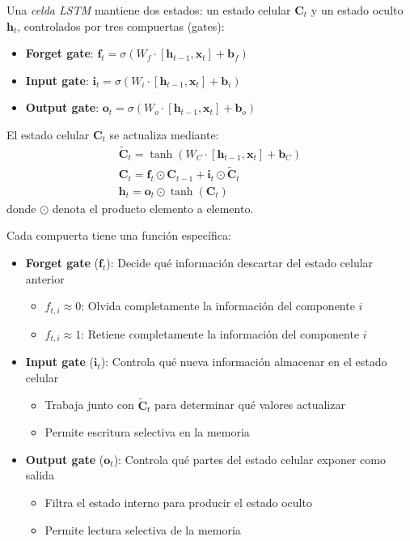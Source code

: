 \begin{definition}\label{def:lstm_cell}
	Una \textit{celda \gls{LSTM}} mantiene dos estados: un estado celular $\mathbf{C}_t$ y un estado oculto $\mathbf{h}_t$, controlados por tres compuertas (gates):
	\begin{itemize}
		\item \textbf{Forget gate}: $\mathbf{f}_t = \sigma(W_f \cdot [\mathbf{h}_{t-1}, \mathbf{x}_t] + \mathbf{b}_f)$
		\item \textbf{Input gate}: $\mathbf{i}_t = \sigma(W_i \cdot [\mathbf{h}_{t-1}, \mathbf{x}_t] + \mathbf{b}_i)$
		\item \textbf{Output gate}: $\mathbf{o}_t = \sigma(W_o \cdot [\mathbf{h}_{t-1}, \mathbf{x}_t] + \mathbf{b}_o)$
	\end{itemize}
	El estado celular $\mathbf{C}_t$ se actualiza mediante:
	\begin{gather*}
		\tilde{\mathbf{C}}_t = \tanh(W_C \cdot [\mathbf{h}_{t-1}, \mathbf{x}_t] + \mathbf{b}_C)\\
		\mathbf{C}_t = \mathbf{f}_t \odot \mathbf{C}_{t-1} + \mathbf{i}_t \odot \tilde{\mathbf{C}}_t\\
		\mathbf{h}_t = \mathbf{o}_t \odot \tanh(\mathbf{C}_t)
	\end{gather*}
	donde $\odot$ denota el producto elemento a elemento.
\end{definition}

Cada compuerta tiene una función específica:

\begin{itemize}
	\item \textbf{Forget gate} ($\mathbf{f}_t$): Decide qué información descartar del estado celular anterior
	\begin{itemize}
		\item $f_{t,i} \approx 0$: Olvida completamente la información del componente $i$
		\item $f_{t,i} \approx 1$: Retiene completamente la información del componente $i$
	\end{itemize}

	\item \textbf{Input gate} ($\mathbf{i}_t$): Controla qué nueva información almacenar en el estado celular
	\begin{itemize}
		\item Trabaja junto con $\tilde{\mathbf{C}}_t$ para determinar qué valores actualizar
		\item Permite escritura selectiva en la memoria
	\end{itemize}

	\item \textbf{Output gate} ($\mathbf{o}_t$): Controla qué partes del estado celular exponer como salida
	\begin{itemize}
		\item Filtra el estado interno para producir el estado oculto
		\item Permite lectura selectiva de la memoria
	\end{itemize}
\end{itemize}

